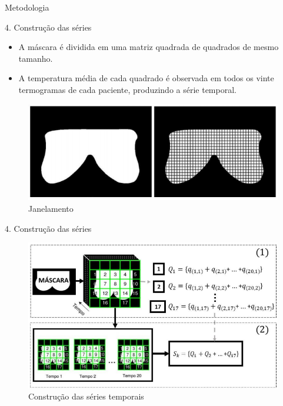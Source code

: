 \documentclass[apesctratio=169]{beamer}
\begin{document}
	\begin{frame}{Metodologia}
	    \begin{block}{4. Construção das séries}
	             \begin{itemize}
	                 \item A máscara é dividida em uma matriz quadrada de quadrados de mesmo tamanho.
	                 \item A temperatura média de cada quadrado é observada em todos os vinte termogramas de cada paciente, produzindo a série temporal.
	            \end{itemize}
	   \end{block}
	   
	   \begin{figure}[H]
			     \includegraphics[scale=0.5]{etapa4.PNG}
			     \caption{Janelamento}
		\end{figure}
	\end{frame}
	
	\begin{frame}{4. Construção das séries}
        \begin{figure}[H]
			     \includegraphics[scale=0.5]{etapa41.PNG}
			     \caption{Construção das séries temporais}
		\end{figure}
	\end{frame}
	
\end{document}
